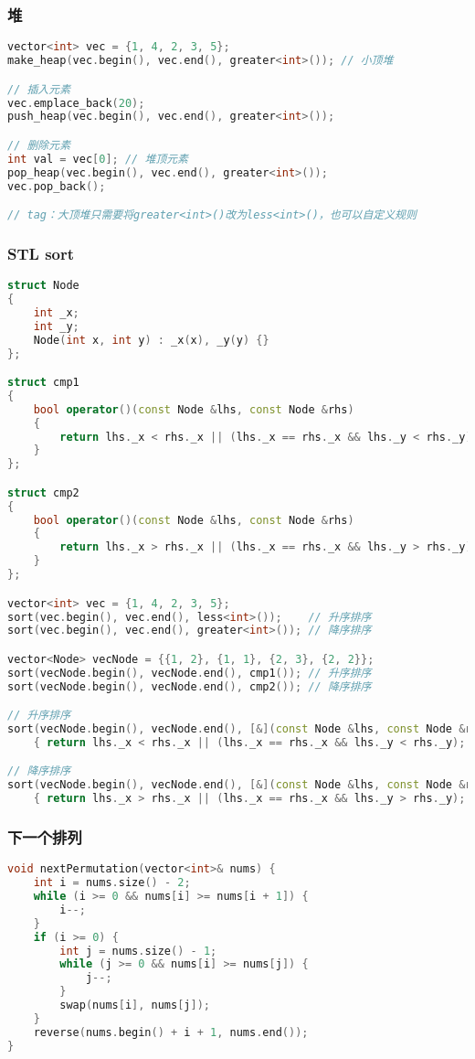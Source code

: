 \documentclass[UTF8]{ctexart}
\begin{document}
\subsubsection*{堆}
\begin{lstlisting}[language=C++]
vector<int> vec = {1, 4, 2, 3, 5};
make_heap(vec.begin(), vec.end(), greater<int>()); // 小顶堆

// 插入元素
vec.emplace_back(20);
push_heap(vec.begin(), vec.end(), greater<int>());

// 删除元素
int val = vec[0]; // 堆顶元素
pop_heap(vec.begin(), vec.end(), greater<int>());
vec.pop_back();

// tag：大顶堆只需要将greater<int>()改为less<int>()，也可以自定义规则
\end{lstlisting}

\clearpage
\subsubsection*{STL sort}
\begin{lstlisting}[language=C++]
struct Node
{
    int _x;
    int _y;
    Node(int x, int y) : _x(x), _y(y) {}
};

struct cmp1
{
    bool operator()(const Node &lhs, const Node &rhs)
    {
        return lhs._x < rhs._x || (lhs._x == rhs._x && lhs._y < rhs._y);
    }
};

struct cmp2
{
    bool operator()(const Node &lhs, const Node &rhs)
    {
        return lhs._x > rhs._x || (lhs._x == rhs._x && lhs._y > rhs._y);
    }
};

vector<int> vec = {1, 4, 2, 3, 5};
sort(vec.begin(), vec.end(), less<int>());    // 升序排序
sort(vec.begin(), vec.end(), greater<int>()); // 降序排序

vector<Node> vecNode = {{1, 2}, {1, 1}, {2, 3}, {2, 2}};
sort(vecNode.begin(), vecNode.end(), cmp1()); // 升序排序
sort(vecNode.begin(), vecNode.end(), cmp2()); // 降序排序

// 升序排序
sort(vecNode.begin(), vecNode.end(), [&](const Node &lhs, const Node &rhs)
    { return lhs._x < rhs._x || (lhs._x == rhs._x && lhs._y < rhs._y); });

// 降序排序
sort(vecNode.begin(), vecNode.end(), [&](const Node &lhs, const Node &rhs)
    { return lhs._x > rhs._x || (lhs._x == rhs._x && lhs._y > rhs._y); });
\end{lstlisting}

\clearpage
\subsubsection*{下一个排列}
\begin{lstlisting}[language=C++]
void nextPermutation(vector<int>& nums) {
    int i = nums.size() - 2;
    while (i >= 0 && nums[i] >= nums[i + 1]) {
        i--;
    }
    if (i >= 0) {
        int j = nums.size() - 1;
        while (j >= 0 && nums[i] >= nums[j]) {
            j--;
        }
        swap(nums[i], nums[j]);
    }
    reverse(nums.begin() + i + 1, nums.end());
}
\end{lstlisting}
\end{document}
